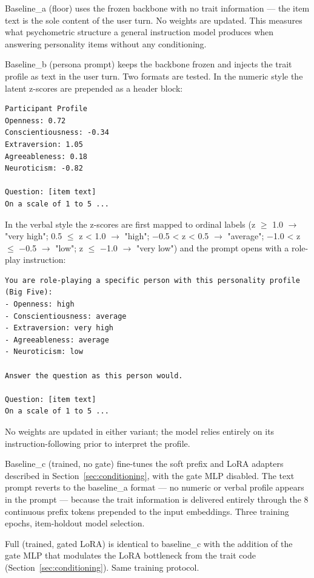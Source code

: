 \documentclass[11pt]{article}
\begin{document}
Baseline\_a (floor) uses the frozen backbone with no trait information — the item text is the sole content of the user turn. No weights are updated. This measures what psychometric structure a general instruction model produces when answering personality items without any conditioning.

Baseline\_b (persona prompt) keeps the backbone frozen and injects the trait profile as text in the user turn. Two formats are tested. In the numeric style the latent z-scores are prepended as a header block:

\begin{verbatim}
Participant Profile
Openness: 0.72
Conscientiousness: -0.34
Extraversion: 1.05
Agreeableness: 0.18
Neuroticism: -0.82

Question: [item text]
On a scale of 1 to 5 ...
\end{verbatim}

In the verbal style the z-scores are first mapped to ordinal labels (z $\geq$ 1.0 $\rightarrow$ "very high"; 0.5 $\leq$ z < 1.0 $\rightarrow$ "high"; $-$0.5 < z < 0.5 $\rightarrow$ "average"; $-$1.0 < z $\leq$ $-$0.5 $\rightarrow$ "low"; z $\leq$ $-$1.0 $\rightarrow$ "very low") and the prompt opens with a role-play instruction:

\begin{verbatim}
You are role-playing a specific person with this personality profile (Big Five):
- Openness: high
- Conscientiousness: average
- Extraversion: very high
- Agreeableness: average
- Neuroticism: low

Answer the question as this person would.

Question: [item text]
On a scale of 1 to 5 ...
\end{verbatim}

No weights are updated in either variant; the model relies entirely on its instruction-following prior to interpret the profile.

Baseline\_c (trained, no gate) fine-tunes the soft prefix and LoRA adapters described in Section~\ref{sec:conditioning}, with the gate MLP disabled. The text prompt reverts to the baseline\_a format — no numeric or verbal profile appears in the prompt — because the trait information is delivered entirely through the 8 continuous prefix tokens prepended to the input embeddings. Three training epochs, item-holdout model selection.

Full (trained, gated LoRA) is identical to baseline\_c with the addition of the gate MLP that modulates the LoRA bottleneck from the trait code (Section~\ref{sec:conditioning}). Same training protocol.
\end{document}

